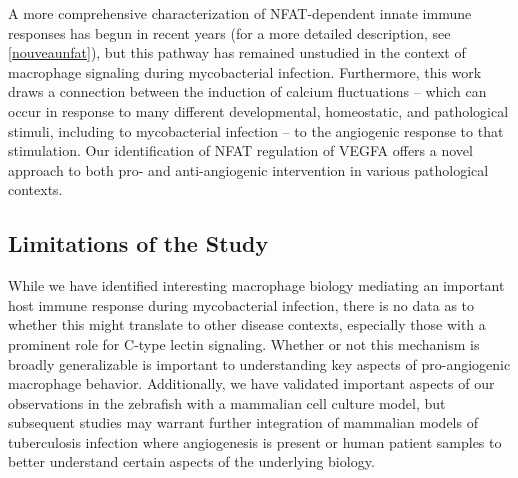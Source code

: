 A more comprehensive characterization of NFAT-dependent innate immune responses has begun in recent years \citep{Deerhake2021, Peuker2022, Poli2022} (for a more detailed description, see \autoref{nouveaunfat}), but this pathway has remained unstudied in the context of macrophage signaling during mycobacterial infection. Furthermore, this work draws a connection between the induction of calcium fluctuations -- which can occur in response to many different developmental, homeostatic, and pathological stimuli, including to mycobacterial infection \citep{Kusner2001, Jayachandran2007, Jayachandran2008, Matty2019, Malik2000} -- to the angiogenic response to that stimulation. Our identification of NFAT regulation of VEGFA offers a novel approach to both pro- and anti-angiogenic intervention in various pathological contexts.

\subsection{Limitations of the Study}

While we have identified interesting macrophage biology mediating an important host immune response during mycobacterial infection, there is no data as to whether this might translate to other disease contexts, especially those with a prominent role for C-type lectin signaling. Whether or not this mechanism is broadly generalizable is important to understanding key aspects of pro-angiogenic macrophage behavior. Additionally, we have validated important aspects of our observations in the zebrafish with a mammalian cell culture model, but subsequent studies may warrant further integration of mammalian models of tuberculosis infection where angiogenesis is present or human patient samples to better understand certain aspects of the underlying biology.



